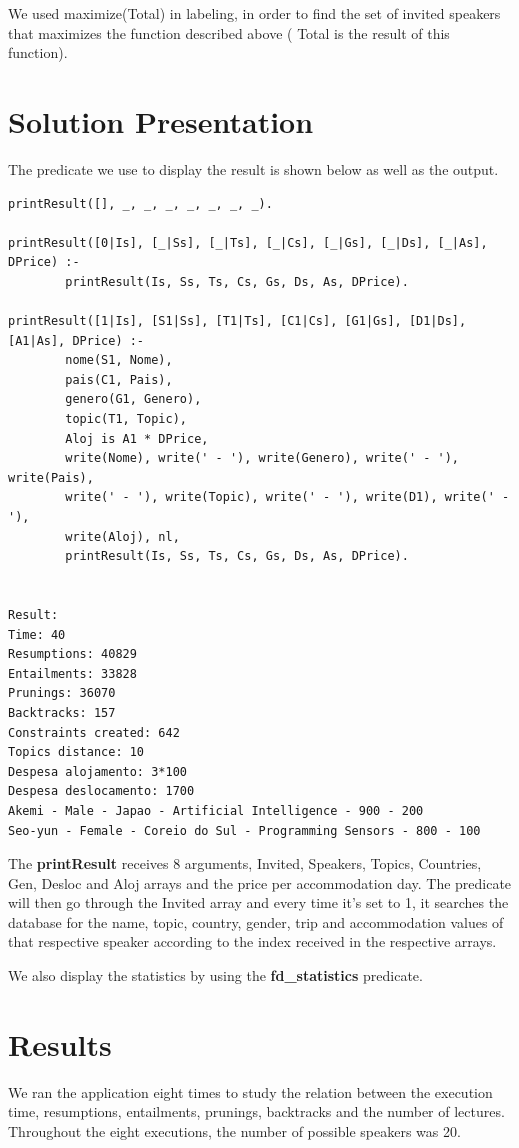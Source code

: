 \documentclass[runningheads,a4paper]{llncs}
\begin{document}
We used maximize(Total) in labeling, in order to find the set of invited speakers that maximizes the function described above ( Total is the result of this function).

\section{Solution Presentation}
The predicate we use to display the result is shown below as well as the output.

\begin{verbatim}
printResult([], _, _, _, _, _, _, _).

printResult([0|Is], [_|Ss], [_|Ts], [_|Cs], [_|Gs], [_|Ds], [_|As], DPrice) :-
        printResult(Is, Ss, Ts, Cs, Gs, Ds, As, DPrice).

printResult([1|Is], [S1|Ss], [T1|Ts], [C1|Cs], [G1|Gs], [D1|Ds], [A1|As], DPrice) :-
        nome(S1, Nome),
        pais(C1, Pais),
        genero(G1, Genero),
        topic(T1, Topic),
        Aloj is A1 * DPrice,
        write(Nome), write(' - '), write(Genero), write(' - '), write(Pais),
        write(' - '), write(Topic), write(' - '), write(D1), write(' - '), 
        write(Aloj), nl,
        printResult(Is, Ss, Ts, Cs, Gs, Ds, As, DPrice).


Result:
Time: 40
Resumptions: 40829
Entailments: 33828
Prunings: 36070
Backtracks: 157
Constraints created: 642
Topics distance: 10
Despesa alojamento: 3*100
Despesa deslocamento: 1700
Akemi - Male - Japao - Artificial Intelligence - 900 - 200
Seo-yun - Female - Coreio do Sul - Programming Sensors - 800 - 100
\end{verbatim}

The \textbf{printResult} receives 8 arguments, Invited, Speakers, Topics, Countries, Gen, Desloc and Aloj arrays and the price per accommodation day. The predicate will then go through the Invited array and every time it's set to 1, it searches the database for the name, topic, country, gender, trip and accommodation values of that respective speaker according to the index received in the respective arrays.

We also display the statistics by using the \textbf{fd\_statistics} predicate.

\section{Results}
We ran the application eight times to study the relation between the execution time, resumptions, entailments, prunings, backtracks and the number of lectures. Throughout the eight executions, the number of possible speakers was 20. 
\end{document}
